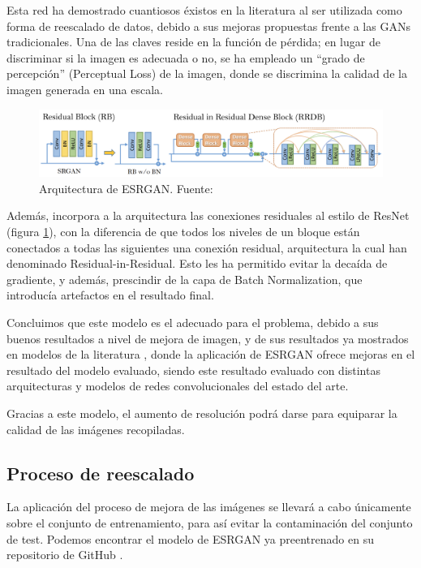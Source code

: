 Esta red ha demostrado cuantiosos éxistos en la literatura al ser utilizada como forma de reescalado de datos, debido a sus mejoras propuestas frente a las GANs tradicionales. Una de las claves reside en la función de pérdida; en lugar de discriminar si la imagen es adecuada o no, se ha empleado un ``grado de percepción'' (Perceptual Loss) de la imagen, donde se discrimina la calidad de la imagen generada en una escala. \\

\begin{figure}[H]
	\centering
	\label {fig:esrgan}
	\includegraphics[scale = 0.2]{imagenes/esrgan.png}
	\caption{Arquitectura de ESRGAN. Fuente: \cite{wang2018esrgan}}
\end{figure}


Además, incorpora a la arquitectura las conexiones residuales al estilo de ResNet (figura \ref{fig:esrgan}), con la diferencia de que todos los niveles de un bloque están conectados a todas las siguientes una conexión residual, arquitectura la cual han denominado Residual-in-Residual. Esto les ha permitido evitar la decaída de gradiente, y además, prescindir de la capa de Batch Normalization, que introducía artefactos en el resultado final.

Concluimos que este modelo es el adecuado para el problema, debido a sus buenos resultados a nivel de mejora de imagen, y de sus resultados ya mostrados en modelos de la literatura \cite{healthcare10071183}, donde la aplicación de ESRGAN ofrece mejoras en el resultado del modelo evaluado, siendo este resultado evaluado con distintas arquitecturas y modelos de redes convolucionales del estado del arte.

Gracias a este modelo, el aumento de resolución podrá darse para equiparar la calidad de las imágenes recopiladas.

\subsection{Proceso de reescalado}

La aplicación del proceso de mejora de las imágenes se llevará a cabo únicamente sobre el conjunto de entrenamiento, para así evitar la contaminación del conjunto de test. Podemos encontrar el modelo de ESRGAN ya preentrenado en su repositorio de GitHub \cite{gitesrgan}.

